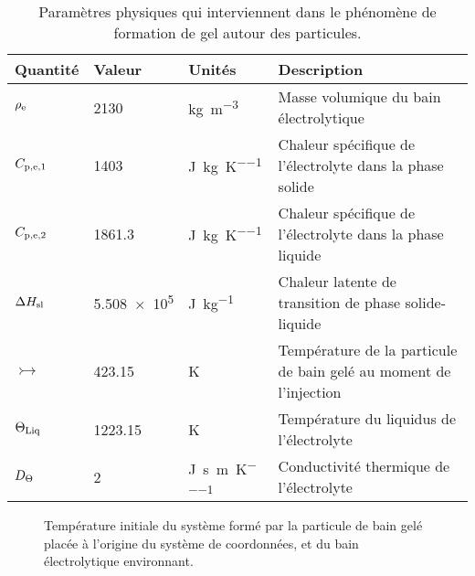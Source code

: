 \begin{table}
  \begin{center}
    \caption{Paramètres physiques qui interviennent dans le
      phénomène de formation de gel autour des particules.}
    \label{tab:freeze-physical-parameters}
    \begin{tabularx}{\textwidth}{@{}lllX@{}}
      \toprule
      Quantité              & Valeur       & Unités                                       & Description \\
      \midrule
      $\rho_\mathrm{e}$ & \num{2130}    & \si{\kg\per\cubic\meter}                    & Masse volumique du bain électrolytique \\
      $C_{\mathrm{p,e,1}}$     & \num{1403}    & \si{\joule\per\kilo\gram\per\kelvin}        & Chaleur spécifique de l'électrolyte dans la phase solide \\
      $C_{\mathrm{p,e,2}}$     & \num{1861.3}  & \si{\joule\per\kilo\gram\per\kelvin}        & Chaleur spécifique de l'électrolyte dans la phase liquide \\
      $\Delta H_\mathrm{sl}$     & \num{5.508e5} & \si{\joule\per\kilo\gram}                   & Chaleur latente de transition de phase solide-liquide \\
      $\tinj$               & \num{423.15}  & \si{\kelvin}                                & Température de la particule de bain gelé au moment de l'injection \\
      $\Theta_\text{Liq}$               & \num{1223.15} & \si{\kelvin}                                & Température du liquidus de l'électrolyte \\
      $D_\Theta$   & \num{2}       & \si{\joule\per\second\per\meter\per\kelvin} & Conductivité thermique de l'électrolyte \\
      \bottomrule
    \end{tabularx}
\end{center}
\end{table}


\begin{figure}[!h]
  \begin{center}
    
    \caption{Température initiale du système formé par la particule de
      bain gelé placée à l'origine du système de coordonnées, et du
      bain électrolytique environnant.}
    \label{fig:particle-initial-temperature}
  \end{center}
\end{figure}

